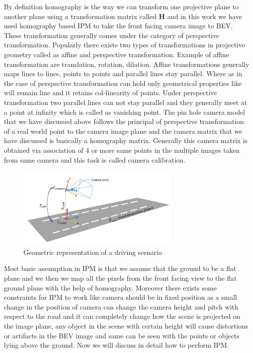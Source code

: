      By definition homography is the way we can transform one projective plane to another plane using a transformation matrix called \textbf{H} and in this work we have used homography based IPM to take the front facing camera image to BEV. These transformation generally comes under the category of perspective transformation. Popularly there exists two types of transformations in projective geometry called as affine and perspective transformation. Example of affine transformation are translation, rotation, dilation. Affine transformations generally maps lines to lines, points to points and parallel lines stay parallel. Where as in the case of perspective transformation can hold only geometrical properties like will remain line and it retains col-linearity of points. Under perspective transformation two parallel lines can not stay parallel and they generally meet at a point at infinity which is called as vanishing point. The pin hole camera model that we have discussed above follows the principal of perspective transformation of a real world point to the camera image plane and the camera matrix that we have discussed is basically a homography matrix. Generally this camera matrix is obtained via association of 4 or more same points in the multiple images taken from same camera and this task is called camera calibration. 
     
            \begin{figure}[h]
    \centering
    \includegraphics[width=8cm, height =4cm]{images/camera_geometry_lane_detection.png}
    \caption{ Geometric representation of a driving scenario \cite{DBLP:journals/corr/abs-1811-10203}}
    \end{figure}
    
     Most basic assumption in IPM is that we assume that the ground to be a flat plane and we then we map all the pixels from the front facing view to the flat ground plane with the help of homography. Moreover there exists some constraints for IPM to work like camera should be in fixed position as a small change in the position of camera can change the camera height and pitch with respect to the road and it can completely change how the scene is projected on the image plane, any object in the scene with certain height will cause distortions or artifacts in the BEV image and same can be seen with the points or objects lying above the ground. Now we will discuss in detail how to perform IPM. 
     
